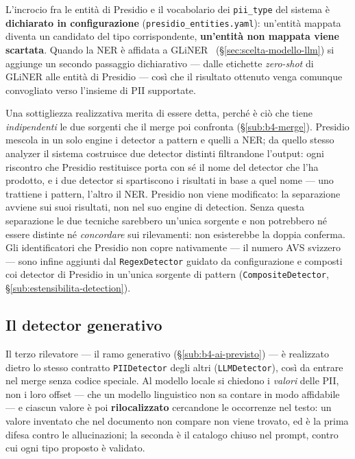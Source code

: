 L'incrocio fra le entità di Presidio e il vocabolario dei \texttt{pii\_type} del sistema è \textbf{dichiarato in configurazione} (\texttt{presidio\_entities.yaml}): un'entità mappata diventa un candidato del tipo corrispondente, \textbf{un'entità non mappata viene scartata}. Quando la NER è affidata a GLiNER~\cite{zaratianaGLiNERGeneralistModel2024} (§\ref{sec:scelta-modello-llm}) si aggiunge un secondo passaggio dichiarativo --- dalle etichette \emph{zero-shot} di GLiNER alle entità di Presidio --- così che il risultato ottenuto venga comunque convogliato verso l'insieme di PII supportate.

Una sottigliezza realizzativa merita di essere detta, perché è ciò che tiene \emph{indipendenti} le due sorgenti che il merge poi confronta (§\ref{sub:b4-merge}). Presidio mescola in un solo engine i detector a pattern e quelli a NER; da quello stesso analyzer il sistema costruisce due detector distinti filtrandone l'output: ogni riscontro che Presidio restituisce porta con sé il nome del detector che l'ha prodotto, e i due detector si spartiscono i risultati in base a quel nome --- uno trattiene i pattern, l'altro il NER. Presidio non viene modificato: la separazione avviene sui suoi risultati, non nel suo engine di detection. Senza questa separazione le due tecniche sarebbero un'unica sorgente e non potrebbero né essere distinte né \emph{concordare} sui rilevamenti: non esisterebbe la doppia conferma. Gli identificatori che Presidio non copre nativamente --- il numero AVS svizzero --- sono infine aggiunti dal \texttt{RegexDetector} guidato da configurazione e composti coi detector di Presidio in un'unica sorgente di pattern (\texttt{CompositeDetector}, §\ref{sub:estensibilita-detection}).

\subsection{Il detector generativo}
\label{sub:impl-ai-detector}

Il terzo rilevatore --- il ramo generativo (§\ref{sub:b4-ai-previsto}) --- è realizzato dietro lo stesso contratto \texttt{PIIDetector} degli altri (\texttt{LLMDetector}), così da entrare nel merge senza codice speciale. Al modello locale si chiedono i \emph{valori} delle PII, non i loro offset --- che un modello linguistico non sa contare in modo affidabile --- e ciascun valore è poi \textbf{rilocalizzato} cercandone le occorrenze nel testo: un valore inventato che nel documento non compare non viene trovato, ed è la prima difesa contro le allucinazioni; la seconda è il catalogo chiuso nel prompt, contro cui ogni tipo proposto è validato.

